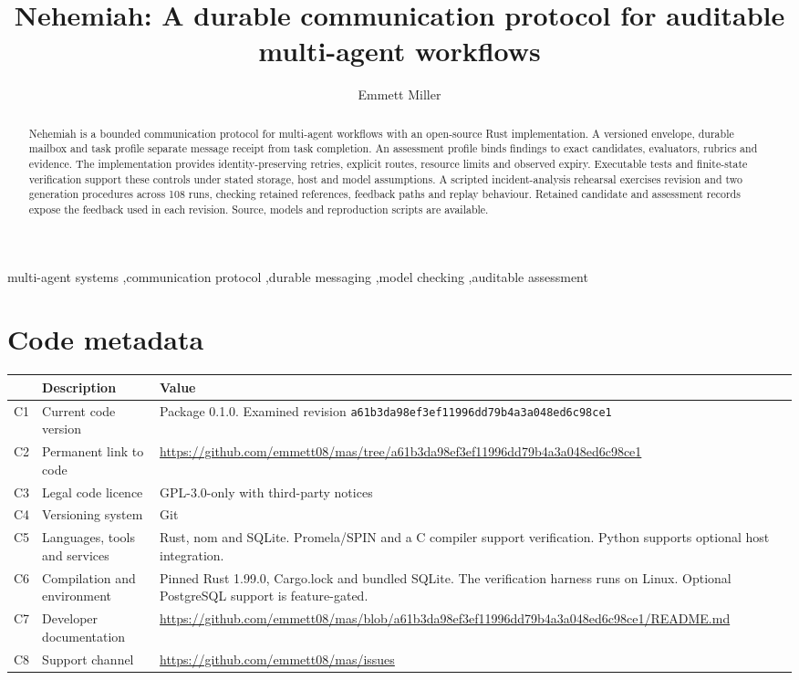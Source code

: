 \documentclass[preprint,12pt,a4paper]{elsarticle}
\begin{document}
\begin{frontmatter}
\title{Nehemiah: A durable communication protocol for auditable multi-agent workflows}
\author{Emmett Miller}
\begin{abstract}
Nehemiah is a bounded communication protocol for multi-agent workflows with an open-source Rust implementation. A versioned envelope, durable mailbox and task profile separate message receipt from task completion. An assessment profile binds findings to exact candidates, evaluators, rubrics and evidence. The implementation provides identity-preserving retries, explicit routes, resource limits and observed expiry. Executable tests and finite-state verification support these controls under stated storage, host and model assumptions. A scripted incident-analysis rehearsal exercises revision and two generation procedures across 108 runs, checking retained references, feedback paths and replay behaviour. Retained candidate and assessment records expose the feedback used in each revision. Source, models and reproduction scripts are available.
\end{abstract}
\begin{keyword}
multi-agent systems \sep communication protocol \sep durable messaging \sep model checking \sep auditable assessment
\end{keyword}
\end{frontmatter}

\section*{Code metadata}
\noindent\begin{tabularx}{\textwidth}{@{}p{}>{\raggedright\arraybackslash}p{}>{\raggedright\arraybackslash}X@{}}
\toprule
 & Description & Value \\
\midrule
C1 & Current code version & Package 0.1.0. Examined revision \nolinkurl{a61b3da98ef3ef11996dd79b4a3a048ed6c98ce1} \\
C2 & Permanent link to code & \url{https://github.com/emmett08/mas/tree/a61b3da98ef3ef11996dd79b4a3a048ed6c98ce1} \\
C3 & Legal code licence & GPL-3.0-only with third-party notices \\
C4 & Versioning system & Git \\
C5 & Languages, tools and services & Rust, nom and SQLite. Promela/SPIN and a C compiler support verification. Python supports optional host integration. \\
C6 & Compilation and environment & Pinned Rust 1.99.0, Cargo.lock and bundled SQLite. The verification harness runs on Linux. Optional PostgreSQL support is feature-gated. \\
C7 & Developer documentation & \url{https://github.com/emmett08/mas/blob/a61b3da98ef3ef11996dd79b4a3a048ed6c98ce1/README.md} \\
C8 & Support channel & \url{https://github.com/emmett08/mas/issues} \\
\bottomrule
\end{tabularx}
\end{document}
